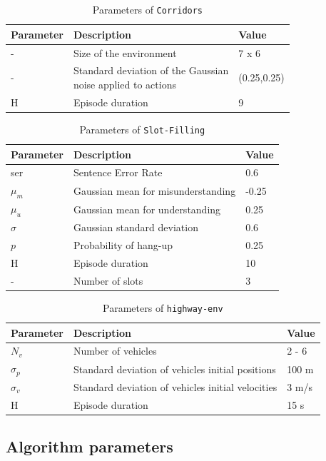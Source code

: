 \begin{table}[ht!]
    \centering
    \begin{tabularx}{1.0\textwidth}{lll}
        \toprule
        Parameter & Description & Value\tabularnewline
        \midrule
        - & Size of the environment & 7 x 6\tabularnewline
        - & \makecell[l]{Standard deviation of the Gaussian \\noise applied to actions} & (0.25,0.25)\tabularnewline
        H & Episode duration & 9\tabularnewline
        \bottomrule
    \end{tabularx}
    \caption{Parameters of \texttt{Corridors}}
    \label{tab:param-corridors}
\end{table}

\begin{table}[ht!]
    \centering
    \begin{tabularx}{1.0\textwidth}{lll}
        \toprule
        Parameter & Description & Value\tabularnewline
        \midrule
        ser & Sentence Error Rate & 0.6\tabularnewline
        $\mu_m$& Gaussian mean for misunderstanding & -0.25\tabularnewline
        $\mu_u$& Gaussian mean for understanding & 0.25\tabularnewline
        $\sigma$& Gaussian standard deviation & 0.6\tabularnewline
        $p$& Probability of hang-up & 0.25\tabularnewline
        H & Episode duration & 10\tabularnewline
        - & Number of slots & 3\tabularnewline
        \bottomrule
    \end{tabularx}
    \caption{Parameters of \texttt{Slot-Filling}}
    \label{tab:param-slot-filling}
\end{table}


\begin{table}[ht!]
    \centering
    \begin{tabularx}{1.0\textwidth}{lll}
        \toprule
        Parameter & Description & Value\tabularnewline
        \midrule
        $N_v$& Number of vehicles & 2 - 6\tabularnewline
        $\sigma_p$& Standard deviation of vehicles initial positions & 100 m\tabularnewline
        $\sigma_v$& Standard deviation of vehicles initial velocities & 3 m/s\tabularnewline
        H & Episode duration & 15 s\tabularnewline
        \bottomrule
    \end{tabularx}

    \caption{Parameters of \texttt{highway-env}}
    \label{tab:param-highway-env}
\end{table}

\subsection{Algorithm parameters}
\label{sec:algorithms-parameters}

